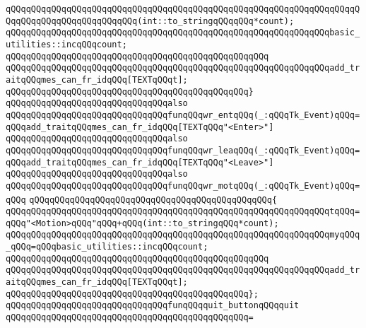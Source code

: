 \verb|qQQqqQQqqQQqqQQqqQQqqQQqqQQqqQQqqQQqqQQqqQQqqQQqqQQqqQQqqQQqqQQqqQQqqQQqqQQqqQQqqQQqqQQqqQQqqQQq(int::to_stringqQQqqQQq*count);|\newline
\newline
\verb|qQQqqQQqqQQqqQQqqQQqqQQqqQQqqQQqqQQqqQQqqQQqqQQqqQQqqQQqqQQqqQQqbasic_utilities::incqQQqcount;|\newline
\verb|qQQqqQQqqQQqqQQqqQQqqQQqqQQqqQQqqQQqqQQqqQQqqQQqqQQq|\newline
\verb|qQQqqQQqqQQqqQQqqQQqqQQqqQQqqQQqqQQqqQQqqQQqqQQqqQQqqQQqqQQqqQQqadd_traitqQQqmes_can_fr_idqQQq[TEXTqQQqt];|\newline
\verb|qQQqqQQqqQQqqQQqqQQqqQQqqQQqqQQqqQQqqQQqqQQqqQQq}|\newline
\newline
\verb|qQQqqQQqqQQqqQQqqQQqqQQqqQQqqQQqalso|\newline
\verb|qQQqqQQqqQQqqQQqqQQqqQQqqQQqqQQqfunqQQqwr_entqQQq(_:qQQqTk_Event)qQQq=qQQqadd_traitqQQqmes_can_fr_idqQQq[TEXTqQQq"<Enter>"]|\newline
\verb|qQQqqQQqqQQqqQQqqQQqqQQqqQQqqQQqalso|\newline
\verb|qQQqqQQqqQQqqQQqqQQqqQQqqQQqqQQqfunqQQqwr_leaqQQq(_:qQQqTk_Event)qQQq=qQQqadd_traitqQQqmes_can_fr_idqQQq[TEXTqQQq"<Leave>"]|\newline
\verb|qQQqqQQqqQQqqQQqqQQqqQQqqQQqqQQqalso|\newline
\verb|qQQqqQQqqQQqqQQqqQQqqQQqqQQqqQQqfunqQQqwr_motqQQq(_:qQQqTk_Event)qQQq=qQQq|\newline
\verb|qQQqqQQqqQQqqQQqqQQqqQQqqQQqqQQqqQQqqQQqqQQqqQQq{|\newline
\verb|qQQqqQQqqQQqqQQqqQQqqQQqqQQqqQQqqQQqqQQqqQQqqQQqqQQqqQQqqQQqqQQqtqQQq=qQQq"<Motion>qQQq"qQQq+qQQq(int::to_stringqQQq*count);|\newline
\verb|qQQqqQQqqQQqqQQqqQQqqQQqqQQqqQQqqQQqqQQqqQQqqQQqqQQqqQQqqQQqqQQqmyqQQq_qQQq=qQQqbasic_utilities::incqQQqcount;|\newline
\verb|qQQqqQQqqQQqqQQqqQQqqQQqqQQqqQQqqQQqqQQqqQQqqQQqqQQq|\newline
\verb|qQQqqQQqqQQqqQQqqQQqqQQqqQQqqQQqqQQqqQQqqQQqqQQqqQQqqQQqqQQqqQQqadd_traitqQQqmes_can_fr_idqQQq[TEXTqQQqt];|\newline
\verb|qQQqqQQqqQQqqQQqqQQqqQQqqQQqqQQqqQQqqQQqqQQqqQQq};|\newline
\newline
\verb|qQQqqQQqqQQqqQQqqQQqqQQqqQQqqQQqfunqQQqquit_buttonqQQqquit|\newline
\verb|qQQqqQQqqQQqqQQqqQQqqQQqqQQqqQQqqQQqqQQqqQQqqQQq=|\newline
